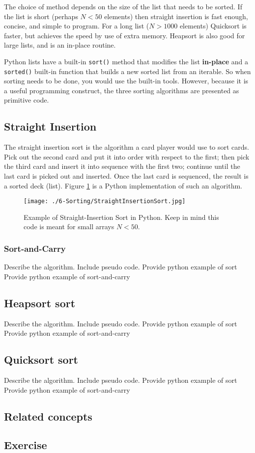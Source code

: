 The choice of method depends on the size of the list that needs to be sorted.  If the list is short (perhaps $N< 50$ elements) then straight insertion is fast enough, concise, and simple to program.     For a long list ($N > 1000$ elements) Quicksort is faster, but achieves the speed by use of extra memory.   Heapsort is also good for large lists, and is an in-place routine.

Python lists have a built-in \texttt{sort()} method that modifies the list \textbf{in-place} and a \texttt{sorted()} built-in function that builds a new sorted list from an iterable.  
So when sorting needs to be done, you would  use the built-in tools.  However, because it is a useful programming construct, the three sorting algorithms are presented as primitive code.


\subsection{Straight Insertion}
The straight insertion sort is the algorithm a card player would use to sort cards.  
Pick out the second card and put it into order with respect to the first; then pick the third card and insert it into sequence with the first two; continue until the last card is picked out and inserted.   
Once the last card is sequenced, the result is a sorted deck (list). Figure \ref{fig:StraightInsertionSort} is a Python implementation of such an algorithm.   
\begin{figure}[h!] %
   \centering
   \texttt{[image: ./6-Sorting/StraightInsertionSort.jpg]} 
   \caption{Example of Straight-Insertion Sort in Python.  Keep in mind this code is meant for small arrays $N<50$.}
   \label{fig:StraightInsertionSort}
\end{figure}
\clearpage
\subsubsection{Sort-and-Carry} 
Describe the algorithm.  Include pseudo code.
Provide python example of sort
Provide python example of sort-and-carry 
\subsection{Heapsort sort}
Describe the algorithm.  Include pseudo code.
Provide python example of sort
Provide python example of sort-and-carry 
\subsection{Quicksort sort}
Describe the algorithm.  Include pseudo code.
Provide python example of sort
Provide python example of sort-and-carry 
\subsection{Related concepts}
\subsection{Exercise}

